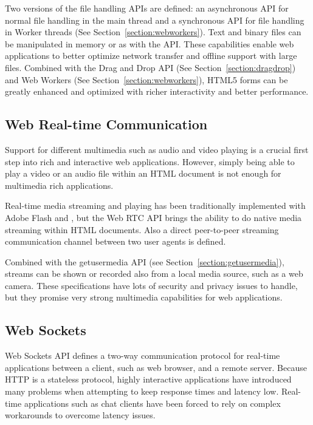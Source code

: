 Two versions of the file handling APIs are defined: an asynchronous
API for normal file handling in the main thread and a synchronous API
for file handling in Worker threads (See
Section~\ref{section:webworkers}). Text and binary files can be
manipulated in memory or as   with the
 API. These capabilities enable web applications to better
optimize network transfer and offline support with large
files. Combined with the Drag and Drop API (See
Section~\ref{section:dragdrop}) and Web Workers (See
Section~\ref{section:webworkers}), HTML5 forms can be greatly enhanced
and optimized with richer interactivity and better performance.

\subsection{Web Real-time Communication}

Support for different multimedia such as audio and video playing is a
crucial first step into rich and interactive web
applications. However, simply being able to play a video or an audio
file within an HTML document is not enough for multimedia rich
applications.

Real-time media streaming and playing has been traditionally
implemented with Adobe Flash \citationneeded and 
\citationneeded, but the Web RTC API \cite{WebRTC} brings the ability
to do native media streaming within HTML documents. Also a direct
peer-to-peer streaming communication channel between two user agents
is defined.

Combined with the getusermedia API \cite{getusermedia} (see
Section~\ref{section:getusermedia}), streams can be shown or recorded
also from a local media source, such as a web camera. These
specifications have lots of security and privacy issues to handle, but
they promise very strong multimedia capabilities for web applications.

\subsection{Web Sockets}

Web Sockets API \cite{WebSockets, WebSocketProtocol} defines a two-way
communication protocol for real-time applications between a client,
such as web browser, and a remote server. Because HTTP is a stateless
protocol, highly interactive applications have introduced many
problems when attempting to keep response times and latency
low. Real-time applications such as chat clients have been forced to
rely on complex workarounds to overcome latency issues.

